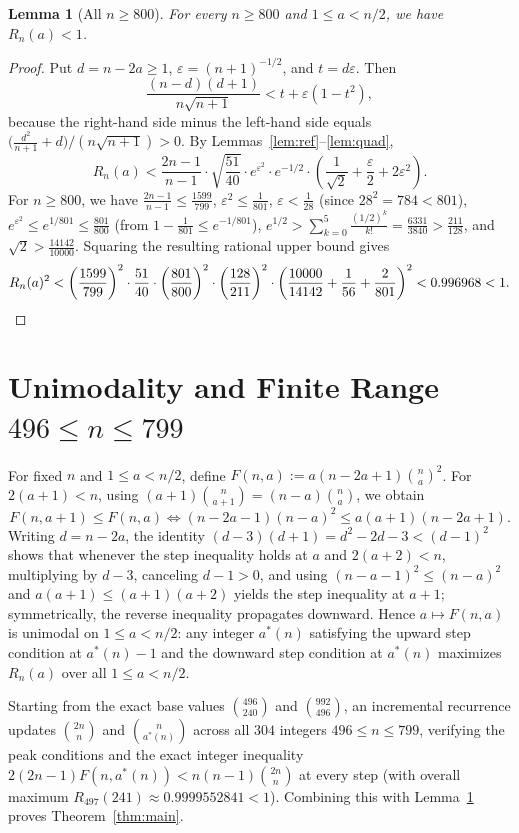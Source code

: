 \documentclass[11pt]{article}
\newtheorem{lemma}[theorem]{Lemma}
\begin{document}
\begin{lemma}[All $n \ge 800$]\label{lem:ge800}
For every $n \ge 800$ and $1 \le a < n/2$, we have $R_n(a) < 1$.
\end{lemma}
\begin{proof}
Put $d = n - 2a \ge 1$, $\varepsilon = (n+1)^{-1/2}$, and $t = d\varepsilon$. Then
\[
\frac{(n-d)(d+1)}{n\sqrt{n+1}} < t + \varepsilon(1 - t^2),
\]
because the right-hand side minus the left-hand side equals $\bigl(\frac{d^2}{n+1} + d\bigr)/(n\sqrt{n+1}) > 0$. By Lemmas~\ref{lem:ref}--\ref{lem:quad},
\[
R_n(a) < \frac{2n-1}{n-1}\cdot \sqrt{\frac{51}{40}}\cdot e^{\varepsilon^2}\cdot e^{-1/2}\cdot \left(\frac{1}{\sqrt{2}} + \frac{\varepsilon}{2} + 2\varepsilon^2\right).
\]
For $n \ge 800$, we have $\frac{2n-1}{n-1} \le \frac{1599}{799}$, $\varepsilon^2 \le \frac{1}{801}$, $\varepsilon < \frac{1}{28}$ (since $28^2 = 784 < 801$), $e^{\varepsilon^2} \le e^{1/801} \le \frac{801}{800}$ (from $1 - \frac{1}{801} \le e^{-1/801}$), $e^{1/2} > \sum_{k=0}^5 \frac{(1/2)^k}{k!} = \frac{6331}{3840} > \frac{211}{128}$, and $\sqrt{2} > \frac{14142}{10000}$. Squaring the resulting rational upper bound gives
\[
R_n(a)^2 < \left(\frac{1599}{799}\right)^2 \cdot \frac{51}{40} \cdot \left(\frac{801}{800}\right)^2 \cdot \left(\frac{128}{211}\right)^2 \cdot \left(\frac{10000}{14142} + \frac{1}{56} + \frac{2}{801}\right)^2 < 0.996968 < 1. \qedhere
\]
\end{proof}

\section{Unimodality and Finite Range $496 \le n \le 799$}
For fixed $n$ and $1 \le a < n/2$, define $F(n,a) := a(n-2a+1)\binom{n}{a}^2$. For $2(a+1) < n$, using $(a+1)\binom{n}{a+1} = (n-a)\binom{n}{a}$, we obtain
\[
F(n,a+1) \le F(n,a) \iff (n-2a-1)(n-a)^2 \le a(a+1)(n-2a+1).
\]
Writing $d = n - 2a$, the identity $(d-3)(d+1) = d^2 - 2d - 3 < (d-1)^2$ shows that whenever the step inequality holds at $a$ and $2(a+2) < n$, multiplying by $d-3$, canceling $d-1 > 0$, and using $(n-a-1)^2 \le (n-a)^2$ and $a(a+1) \le (a+1)(a+2)$ yields the step inequality at $a+1$; symmetrically, the reverse inequality propagates downward. Hence $a \mapsto F(n,a)$ is unimodal on $1 \le a < n/2$: any integer $a^*(n)$ satisfying the upward step condition at $a^*(n)-1$ and the downward step condition at $a^*(n)$ maximizes $R_n(a)$ over all $1 \le a < n/2$.

Starting from the exact base values $\binom{496}{240}$ and $\binom{992}{496}$, an incremental recurrence updates $\binom{2n}{n}$ and $\binom{n}{a^*(n)}$ across all $304$ integers $496 \le n \le 799$, verifying the peak conditions and the exact integer inequality $2(2n-1)F(n,a^*(n)) < n(n-1)\binom{2n}{n}$ at every step (with overall maximum $R_{497}(241) \approx 0.9999552841 < 1$). Combining this with Lemma~\ref{lem:ge800} proves Theorem~\ref{thm:main}.
\end{document}
